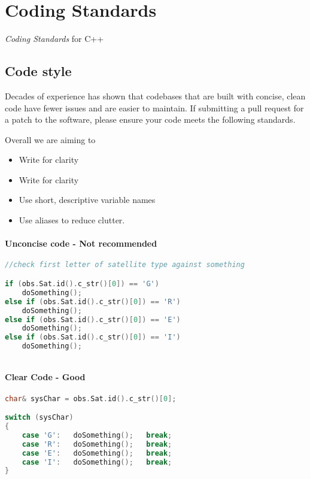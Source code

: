 \chapter{Coding Standards}
\label{ch:coding_standards}

\textit{Coding Standards} for C++

\section{Code style}
Decades of experience has shown that codebases that are built with concise, clean code have fewer issues and are easier to maintain. If submitting a pull request for a patch to the software, please ensure your code meets the following standards.

Overall we are aiming to
\begin{itemize}
	\item  Write for clarity
	\item  Write for clarity
	\item  Use short, descriptive variable names
	\item  Use aliases to reduce clutter.
\end{itemize}

\subsubsection{Unconcise code - Not recommended}
\begin{lstlisting}[language=C++]
//check first letter of satellite type against something

if (obs.Sat.id().c_str()[0]) == 'G') 
    doSomething(); 
else if (obs.Sat.id().c_str()[0]) == 'R')
    doSomething();
else if (obs.Sat.id().c_str()[0]) == 'E')
    doSomething();
else if (obs.Sat.id().c_str()[0]) == 'I')
    doSomething();
    
\end{lstlisting}

\subsubsection{Clear Code - Good}

\begin{lstlisting}[language=c++]
char& sysChar = obs.Sat.id().c_str()[0];

switch (sysChar)
{
    case 'G':   doSomething();   break;
    case 'R':   doSomething();   break;
    case 'E':   doSomething();   break;
    case 'I':   doSomething();   break;
}
\end{lstlisting}


